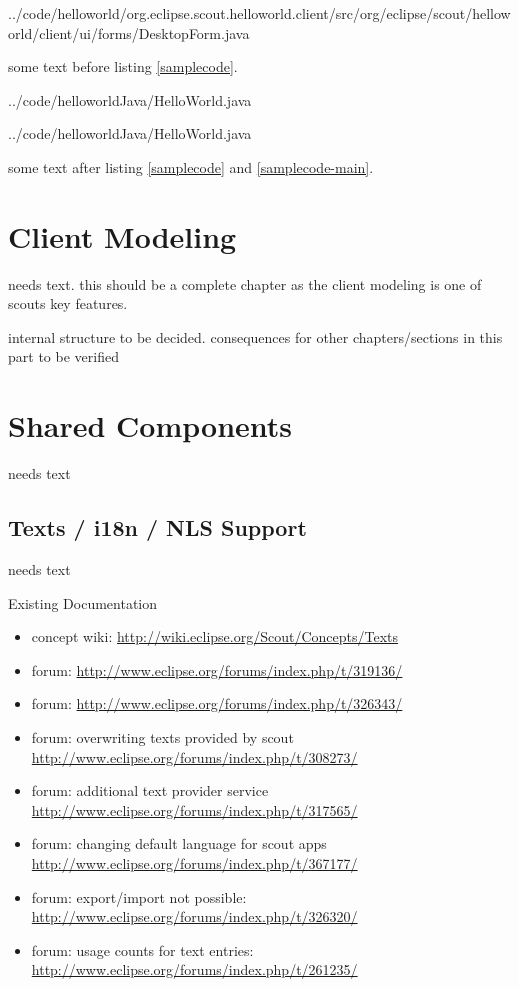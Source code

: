 \documentclass[a4paper,10pt,twoside]{book}
\begin{document}

{../code/helloworld/org.eclipse.scout.helloworld.client/src/org/eclipse/scout/helloworld/client/ui/forms/DesktopForm.java}


some text before listing \ref{samplecode}.


{../code/helloworldJava/HelloWorld.java}



{../code/helloworldJava/HelloWorld.java}


some text after listing \ref{samplecode} and \ref{samplecode-main}.

\chapter{Client Modeling}

needs text. this should be a complete chapter as the client modeling is one
of scouts key features.

internal structure to be decided. consequences for other chapters/sections in
this part to be verified

\chapter{Shared Components}
needs text
  
\section{Texts / i18n / NLS Support}
needs text

\noindent Existing Documentation
\begin{itemize}
  \item concept wiki: \url{http://wiki.eclipse.org/Scout/Concepts/Texts}
  \item forum: \url{http://www.eclipse.org/forums/index.php/t/319136/}
  \item forum: \url{http://www.eclipse.org/forums/index.php/t/326343/}
  \item forum: overwriting texts provided by scout \url{http://www.eclipse.org/forums/index.php/t/308273/}
  \item forum: additional text provider service \url{http://www.eclipse.org/forums/index.php/t/317565/}
  \item forum: changing default language for scout apps \url{http://www.eclipse.org/forums/index.php/t/367177/}
  \item forum: export/import not possible: \url{http://www.eclipse.org/forums/index.php/t/326320/}
  \item forum: usage counts for text entries: \url{http://www.eclipse.org/forums/index.php/t/261235/}
\end{itemize}
\end{document}
